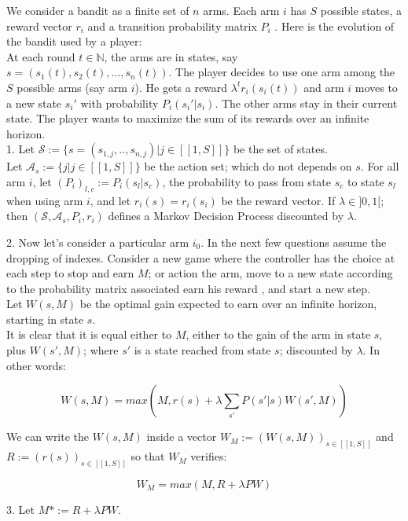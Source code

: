 \documentclass[12pt]{article}
\begin{document}
We consider a bandit as a finite set of $n$ arms. Each arm $i$ has $S$ possible states,
a reward vector $r_i$ and a transition probability matrix $P_i$ . Here is the evolution
of the bandit used by a player: \\
At each round $t \in \mathbb{N}$, the arms are in states, say $s = (s_1 (t), s_2 (t), . . . , s_n (t))$. The player decides to use one arm among the $S$ possible arms (say arm $i$). He gets a reward $\lambda^t r_i (s_i(t) )$ and arm $i$ moves to a new state $s_i'$ with probability $P_i (s_i'|s_i )$. The other arms stay in their current state. The
player wants to maximize the sum of its rewards over an infinite horizon. \\


1. Let $\mathcal{S} := \{s = (s_{1,j}, .. , s_{n, j}) | j \in [[1, S]]  \}$ be the set of states.\\
 Let $\mathcal{A}_s := \{j | j \in [[1, S]]\}$ be the action set; which do not depends on $s$. 
 For all arm $i$, let $(P_i)_{l,c} := P_i(s_l |s_c)$, the probability to pass from state $s_c$ to state $s_l$ when using arm $i$, and let $r_i(s) = r_i(s_i)$ be the reward vector. 
If $\lambda \in ]0,1[$; then  $(\mathcal{S}, \mathcal{A}_s, P_i, r_i)$ defines a Markov Decision Process discounted by $\lambda$. 

2. Now let's consider a particular arm $i_0$. In the next few questions assume the dropping of indexes. 
Consider a new game where the controller has the choice at each step to stop and earn $M$\footnotemark ; or action the arm, move to a new state according to the probability matrix associated earn his reward \footnotemark[\value{footnote}], and start a new step. \\
Let $W(s,M)$ be the optimal gain expected to earn over an infinite horizon, starting in state $s$. \\
It is clear that it is equal either to $M$, either to the gain of the arm in state $s$, plus $W(s', M)$; where $s'$ is a state reached from state $s$; discounted by $\lambda$. In other words: 

$$W(s,M) = max( M , r(s) + \lambda  \sum_{s'} P(s' | s) W(s', M)) $$

We can write the $W(s,M)$ inside a vector $W_M := (W(s,M))_{s\in [[1, S]]}$ and $R := (r(s))_{s \in [[1,S]]}$ so that $W_M$ verifies:

$$ W_M = max ( M , R + \lambda PW)$$

3. Let $M* := R + \lambda PW$.
\end{document}

